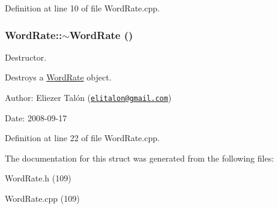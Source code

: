 Definition at line 10 of file WordRate.cpp.\hypertarget{struct_word_rate_a86a63516e4c3d4e8aa9060ea5be6b23}{
\subsubsection[$\sim$WordRate]{\setlength{\rightskip}{0pt plus 5cm}WordRate::$\sim$WordRate ()}}
\label{struct_word_rate_a86a63516e4c3d4e8aa9060ea5be6b23}


Destructor. 

Destroys a \hyperlink{struct_word_rate}{WordRate} object.

\begin{Desc}
\item[Author:]Eliezer Talón (\href{mailto:elitalon@gmail.com}{\tt elitalon@gmail.com}) \end{Desc}
\begin{Desc}
\item[Date:]2008-09-17 \end{Desc}


Definition at line 22 of file WordRate.cpp.

The documentation for this struct was generated from the following files:\begin{CompactItemize}
\item 
WordRate.h (109)\item 
WordRate.cpp (109)\end{CompactItemize}

